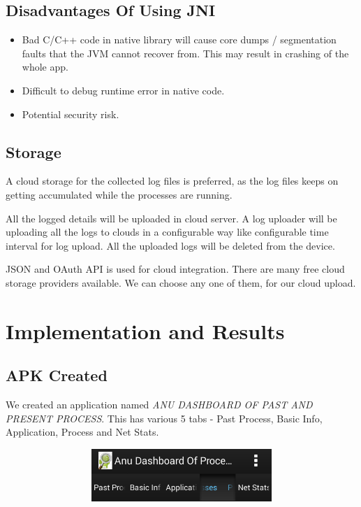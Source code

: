 \documentclass[12pt]{report}
\begin{document}
\section{Disadvantages Of Using JNI}
\begin{itemize}
	\item Bad C/C++ code in native library will cause core dumps / segmentation faults that the JVM cannot recover from. This may result in crashing of the whole app.
	\item Difficult to debug runtime error in native code.
	\item Potential security risk.
\end{itemize}

\section{Storage}
A cloud storage for the collected log files is preferred, as the log files keeps on getting accumulated while the processes are running.

All the logged details will be uploaded in cloud server. A log uploader will be uploading all the logs to clouds in a configurable way like configurable time interval for log upload. All the uploaded logs will be deleted from the device.

JSON and OAuth API is used for cloud integration. There are many free cloud storage providers available. We can choose any one of them, for our cloud upload.

\chapter{Implementation and Results}

\section{APK Created}
We created an application named \textit{ANU DASHBOARD OF PAST AND PRESENT PROCESS}. This has various 5 tabs - Past Process, Basic Info, Application, Process and Net Stats.

 \begin{figure}[H]
	\centering
	\includegraphics[width=1.0\textwidth,width=10cm,height=2cm]{tabs}
\end{figure} 
\end{document}
